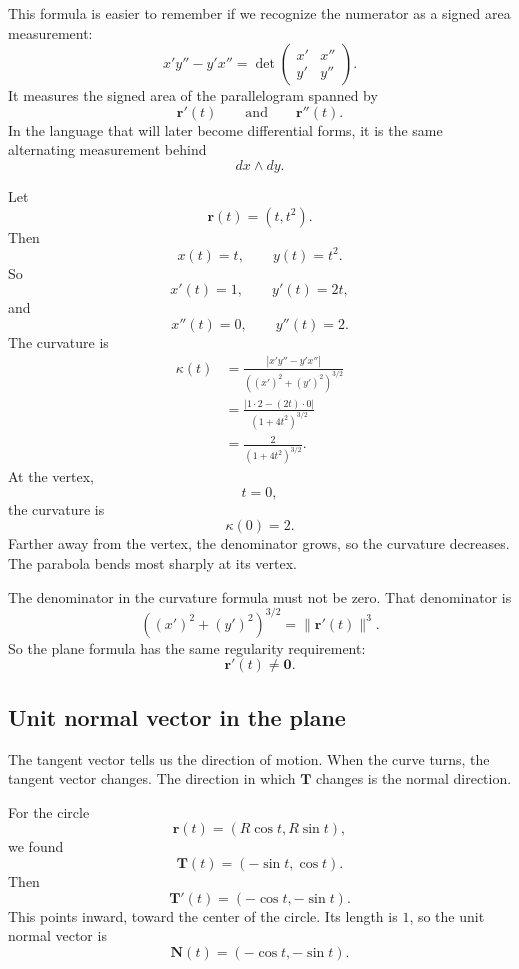 This formula is easier to remember if we recognize the numerator as a signed area
measurement:
\[
    x'y''-y'x''
    =
    \det
    \begin{pmatrix}
    x' & x''\\
    y' & y''
    \end{pmatrix}.
\]
It measures the signed area of the parallelogram spanned by
\[
    \mathbf r'(t)
    \qquad\text{and}\qquad
    \mathbf r''(t).
\]
In the language that will later become differential forms, it is the same alternating
measurement behind
\[
    dx\wedge dy.
\]

\begin{example}
Let
\[
    \mathbf r(t)=(t,t^2).
\]
Then
\[
    x(t)=t,\qquad y(t)=t^2.
\]
So
\[
    x'(t)=1,\qquad y'(t)=2t,
\]
and
\[
    x''(t)=0,\qquad y''(t)=2.
\]
The curvature is
\[
\begin{aligned}
    \kappa(t)
    &=
    \frac{|x'y''-y'x''|}
    {\left((x')^2+(y')^2\right)^{3/2}}\\
    &=
    \frac{|1\cdot2-(2t)\cdot0|}
    {\left(1+4t^2\right)^{3/2}}\\
    &=
    \frac{2}{(1+4t^2)^{3/2}}.
\end{aligned}
\]
At the vertex,
\[
    t=0,
\]
the curvature is
\[
    \kappa(0)=2.
\]
Farther away from the vertex, the denominator grows, so the curvature decreases.  The
parabola bends most sharply at its vertex.
\end{example}

The denominator in the curvature formula must not be zero.  That denominator is
\[
    \left((x')^2+(y')^2\right)^{3/2}
    =
    \|\mathbf r'(t)\|^3.
\]
So the plane formula has the same regularity requirement:
\[
    \mathbf r'(t)\ne\mathbf 0.
\]

\subsection{Unit normal vector in the plane}

The tangent vector tells us the direction of motion.  When the curve turns, the tangent
vector changes.  The direction in which \(\mathbf T\) changes is the normal direction.

For the circle
\[
    \mathbf r(t)=(R\cos t,R\sin t),
\]
we found
\[
    \mathbf T(t)=(-\sin t,\cos t).
\]
Then
\[
    \mathbf T'(t)=(-\cos t,-\sin t).
\]
This points inward, toward the center of the circle.  Its length is \(1\), so the unit
normal vector is
\[
    \mathbf N(t)=(-\cos t,-\sin t).
\]

